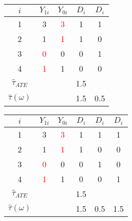 \documentclass{beamer}
\numberwithin{equation}{section}
\begin{document}
\begin{frame}
\begin{overprint}
\begin{tabular}{ccccc}
\multicolumn{1}{p{1cm}}{\center $i$} &   \multicolumn{1}{p{1cm}}{\center $Y_{1i}$} & \multicolumn{1}{p{1cm}}{\center $Y_{0i}$} &   \multicolumn{1}{p{1cm}}{\center $D_{i}$} &\multicolumn{1}{p{.5cm}}{\center $D_{i}$} \\
\hline
\rowcolor{gray!10}        1 &          3 &        \textcolor{red}{3} &                  1 & 1  \\
\rowcolor{gray!30}         2 &         1 &       \textcolor{red}{1} &                    1 & 0  \\
\rowcolor{gray!10}         3 &          \textcolor{red}{0} &         0 &                    0 & 1 \\
\rowcolor{gray!30}         4 &          \textcolor{red}{1} &         1 &                    0 & 0  \\
\hline
$\widehat{\tau}_{ATE}$    &                               &                       &   1.5   &    \\
$\hat\tau(\omega)$   &                               &                       & 1.5  &  0.5      \\
\end{tabular}
\begin{tabular}{cccccc}
 \multicolumn{1}{p{1cm}}{\center $i$} &   \multicolumn{1}{p{1cm}}{\center $Y_{1i}$} & \multicolumn{1}{p{1cm}}{\center $Y_{0i}$} &   \multicolumn{1}{p{1cm}}{\center $D_{i}$} &\multicolumn{1}{p{.5cm}}{\center $D_{i}$} &\multicolumn{1}{p{.5cm}}{\center $D_{i}$} \\
\hline
\rowcolor{gray!10}        1 &          3 &        \textcolor{red}{3} &                  1 & 1  & 1  \\
\rowcolor{gray!30}         2 &         1 &       \textcolor{red}{1} &                    1 & 0 & 0 \\
\rowcolor{gray!30}         3 &          \textcolor{red}{0} &         0 &                    0 & 1 & 0\\
\rowcolor{gray!10}         4 &          \textcolor{red}{1} &         1 &                    0 & 0 & 1 \\
\hline
$\widehat{\tau}_{ATE}$    &                               &                       &   1.5   &  &  \\
$\hat\tau(\omega)$    &                               &                       &  1.5 &  0.5  &  1.5  \\
\end{tabular}
\begin{tabular}{ccccccc}

\end{tabular}
\end{overprint}
\end{frame}
\end{document}
